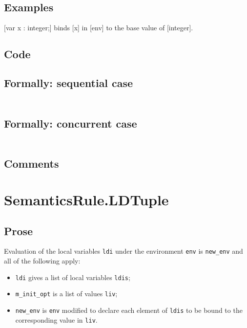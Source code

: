\documentclass{book}
\begin{document}
    \subsection{Examples}
    [var x : integer;] binds [x] in [env] to the base value of [integer].

  \subsection{Code}

  \subsection{Formally: sequential case}
  \begin{align}
  \end{align} 

  \subsection{Formally: concurrent case}
  \begin{align}
  \end{align} 

    \subsection{Comments}

\section{SemanticsRule.LDTuple \label{sec:SemanticsRule.LDTuple}}

    \subsection{Prose}
Evaluation of the local variables \texttt{ldi} under the environment
\texttt{env} is \texttt{new\_env} and all of the following apply:
    \begin{itemize}
    \item \texttt{ldi} gives a list of local variables \texttt{ldis};
    \item \texttt{m\_init\_opt} is a list of values \texttt{liv};
    \item \texttt{new\_env} is \texttt{env} modified to declare each element of \texttt{ldis} to be bound
      to the corresponding value in \texttt{liv}.
    \end{itemize}
\end{document}
